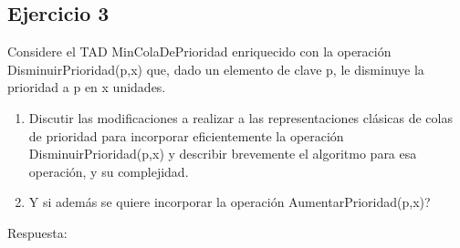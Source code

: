 \documentclass[10pt, a4paper]{article}
\begin{document}
\subsection*{Ejercicio 3}
Considere el TAD MinColaDePrioridad enriquecido con la operaci\'on DisminuirPrioridad(p,x) que, dado un elemento de clave p, le disminuye la prioridad a p en x unidades.

\begin{enumerate}
 \item Discutir las modificaciones a realizar a las representaciones cl\'asicas de colas de prioridad para incorporar eficientemente la operaci\'on DisminuirPrioridad(p,x) y describir brevemente el algoritmo para esa operaci\'on, y su complejidad.

 \item Y si adem\'as se quiere incorporar la operaci\'on AumentarPrioridad(p,x)?
\end{enumerate}

Respuesta:
\end{document}
